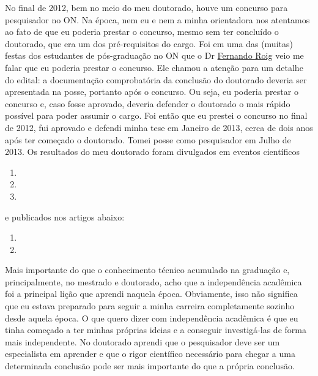 \noindent No final de 2012, bem no meio do meu doutorado, houve um concurso para pesquisador no ON.
Na época, nem eu e nem a minha orientadora nos atentamos ao fato de que eu poderia 
prestar o concurso, mesmo sem ter concluído o doutorado, que era um dos pré-requisitos do
cargo. Foi em uma das (muitas) festas dos estudantes de pós-graduação no ON que
o Dr \href{https://lattes.cnpq.br/5822763057370791}{Fernando Roig} veio me falar que eu poderia prestar o concurso.
Ele chamou a atenção para um detalhe do edital: a documentação comprobatória da conclusão 
do doutorado deveria ser apresentada na posse, portanto após o concurso. 
Ou seja, eu poderia prestar o concurso e, caso fosse aprovado, deveria defender o doutorado
o mais rápido possível para poder assumir o cargo.
Foi então que eu prestei o concurso no final de 2012, fui aprovado e defendi minha tese em
Janeiro de 2013, cerca de dois anos após ter começado o doutorado. 
Tomei posse como pesquisador
em Julho de 2013. Os resultados do meu doutorado foram divulgados em eventos científicos
\begin{enumerate}
	\item {}
	\item {}
	\item {}
\end{enumerate}
\noindent e publicados nos artigos abaixo:
\begin{enumerate}
	\item {}
	\item {}
\end{enumerate}

\bigskip

\noindent Mais importante do que o conhecimento técnico acumulado na graduação e, 
principalmente, no mestrado e doutorado, acho que a independência acadêmica 
foi a principal lição que aprendi naquela época.
Obviamente, isso não significa que eu estava preparado para seguir a minha 
carreira completamente sozinho desde aquela época. O que quero dizer com 
independência acadêmica é que eu tinha começado a ter minhas próprias ideias
e a conseguir investigá-las de forma mais independente.
No doutorado aprendi que o pesquisador deve ser um especialista em aprender
e que o rigor científico necessário para chegar a uma determinada conclusão pode ser
mais importante do que a própria conclusão.
